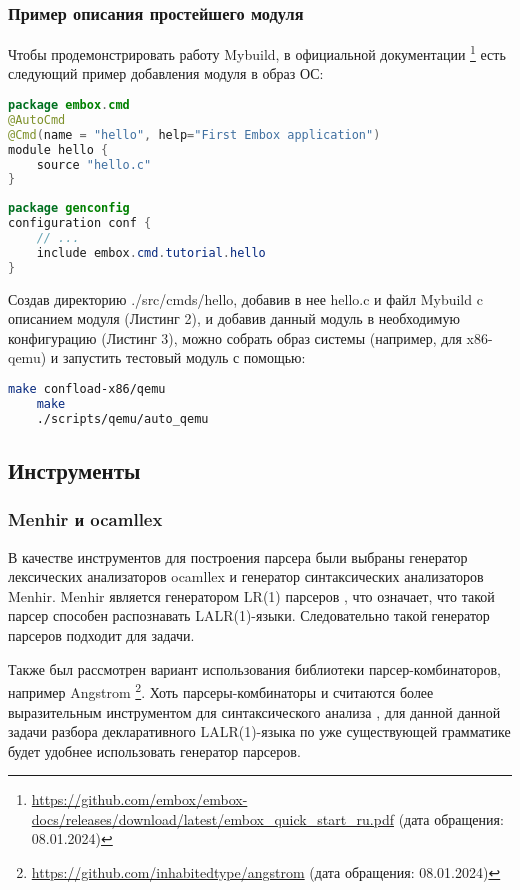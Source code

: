 \subsubsection{Пример описания простейшего модуля}
Чтобы продемонстрировать работу Mybuild, в официальной документации
\footnote{\href{https://github.com/embox/embox-docs/releases/download/latest/embox\_quick\_start\_ru.pdf}
	{https://github.com/embox/embox-docs/releases/download/latest/embox\_quick\_start\_ru.pdf} (дата обращения: 08.01.2024)} есть следующий пример добавления модуля в образ ОС:

\begin{lstlisting}[caption=Пример описания модуля, language=Java, frame=single, breaklines]
package embox.cmd
@AutoCmd
@Cmd(name = "hello", help="First Embox application")
module hello {
    source "hello.c"
}
\end{lstlisting}

\begin{lstlisting}[caption=Пример описания конфигурации, language=Java, frame=single, breaklines]
package genconfig
configuration conf {
    // ...
    include embox.cmd.tutorial.hello
}
\end{lstlisting}

Создав директорию ./src/cmds/hello, добавив в нее hello.c и файл Mybuild c описанием модуля (Листинг 2), и добавив данный модуль в необходимую конфигурацию (Листинг 3), можно собрать образ системы (например, для x86-qemu) и запустить тестовый модуль с помощью:
\begin{lstlisting}[caption=Запуск тестового модуля, language=bash, frame=single, breaklines]
    make confload-x86/qemu
    make
    ./scripts/qemu/auto_qemu
\end{lstlisting}
\subsection{Инструменты}
\subsubsection[short]{Menhir и ocamllex}
В качестве инструментов для построения парсера были выбраны генератор лексических анализаторов ocamllex и генератор синтаксических анализаторов Menhir. Menhir является генератором LR(1) парсеров \cite{2021MenhirRM}, что означает, что такой парсер способен распознавать LALR(1)-языки. Следовательно такой генератор парсеров подходит для задачи.

Также был рассмотрен вариант использования библиотеки парсер-комбинаторов, например Angstrom \footnote{\href{https://github.com/inhabitedtype/angstrom}{https://github.com/inhabitedtype/angstrom} (дата обращения: 08.01.2024)}. Хоть парсеры-комбинаторы и считаются более выразительным инструментом для синтаксического анализа \cite{KURS201857}, для данной данной задачи разбора декларативного LALR(1)-язы\-ка по уже существующей грамматике будет удобнее использовать генератор парсеров.

